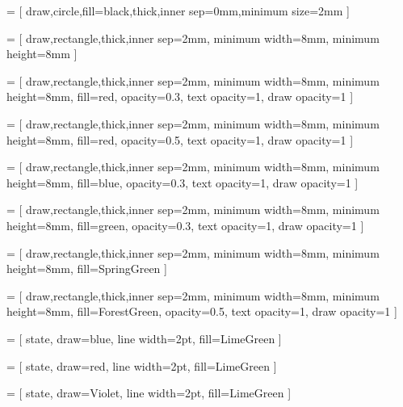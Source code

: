   = 
[
	draw,circle,fill=black,thick,inner sep=0mm,minimum size=2mm
]

  =
[
	draw,rectangle,thick,inner sep=2mm,
	minimum width=8mm, minimum height=8mm
]

 = 
[
	draw,rectangle,thick,inner sep=2mm,
	minimum width=8mm, minimum height=8mm,
	fill=red, opacity=0.3, text opacity=1, draw opacity=1
]

 = 
[
	draw,rectangle,thick,inner sep=2mm,
	minimum width=8mm, minimum height=8mm,
	fill=red, opacity=0.5, text opacity=1, draw opacity=1
]


 = 
[
	draw,rectangle,thick,inner sep=2mm,
	minimum width=8mm, minimum height=8mm,
	fill=blue, opacity=0.3, text opacity=1, draw opacity=1
]

 = 
[
	draw,rectangle,thick,inner sep=2mm,
	minimum width=8mm, minimum height=8mm,
	fill=green, opacity=0.3, text opacity=1, draw opacity=1
]

 = 
[
	draw,rectangle,thick,inner sep=2mm,
	minimum width=8mm, minimum height=8mm,
	fill=SpringGreen
]

 = 
[
	draw,rectangle,thick,inner sep=2mm,
	minimum width=8mm, minimum height=8mm,
	fill=ForestGreen, opacity=0.5, text opacity=1, draw opacity=1
]


  = 
[
	state, draw=blue, line width=2pt,
	fill=LimeGreen
]

  = 
[
	state, draw=red, line width=2pt,
	fill=LimeGreen
]

  = 
[
	state, draw=Violet, line width=2pt,
	fill=LimeGreen
]
